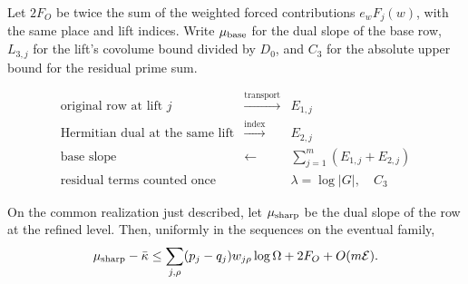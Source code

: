 Let \(2F_O\) be twice the sum of the weighted forced
contributions \(e_w F_j(w)\), with the same place and lift
indices. Write \(\mu_{\rm base}\) for the dual slope of the base
row, \(L_{3,j}\) for the lift's covolume bound divided by \(D_0\),
and \(C_3\) for the absolute upper bound for the residual prime sum.

\begin{construction}
\[
\begin{array}{ccl}
\text{original row at lift }j&\xrightarrow{\text{transport}}& E_{1,j}\\
\text{Hermitian dual at the same lift}&\xrightarrow{\text{index}}& E_{2,j}\\[3pt]
\text{base slope}&\longleftarrow&\displaystyle\sum_{j=1}^m(E_{1,j}+E_{2,j})\\
\text{residual terms counted once}& &\lambda=\log|G|,\quad C_3
\end{array}
\]
\caption{The two indices in the determinant comparison. The row, lift and character multiplicities are fixed before the two estimates are added.}\label{fig:common-division-errors}
\end{construction}

\begin{proposition}
\label{prop:refined-row-slope}
On the common realization just described, let \(\mu_{\rm sharp}\) be
the dual slope of the row at the refined level. Then, uniformly in
the sequences on the eventual family,
\[
 \mu_{\rm sharp}-\bar\kappa
 \le \sum_{j,\rho}(p_j-q_j)w_{j\rho}\log\Omega+2F_O
                   +O(m\mathcal E).
\]
\end{proposition}

